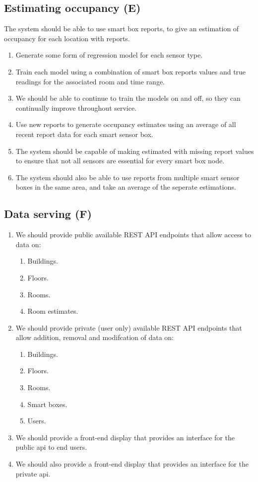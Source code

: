 \documentclass{l4proj}
\begin{document}
\subsection{Estimating occupancy (E)}
The system should be able to use smart box reports, to give an estimation of occupancy for each location with reports.
\begin{enumerate}
  \item Generate some form of regression model for each sensor type.
  \item Train each model using a combination of smart box reports values and true readings for the associated room and time range.
  \item We should be able to continue to train the models on and off, so they can continually improve throughout service.
  \item Use new reports to generate occupancy estimates using an average of all recent report data for each smart sensor box.
  \item The system should be capable of making estimated with missing report values to ensure that not all sensors are essential for every smart box node.
  \item The system should also be able to use reports from multiple smart sensor boxes in the same area, and take an average of the seperate estimations.
\end{enumerate}

\subsection{Data serving (F)}
\begin{enumerate} 
  \item We should provide public available REST API endpoints that allow access to data on:
  \begin{enumerate}
    \item Buildings.
    \item Floors.
    \item Rooms.
    \item Room estimates.
  \end{enumerate}
  \item We should provide private (user only) available REST API endpoints that allow addition, removal and modifcation of data on:
  \begin{enumerate}
    \item Buildings.
    \item Floors.
    \item Rooms.
    \item Smart boxes.
    \item Users.
  \end{enumerate}
 \item We should provide a front-end display that provides an interface for the public api to end users.
 \item We should also provide a front-end display that provides an interface for the private api.
\end{enumerate}
\end{document}
